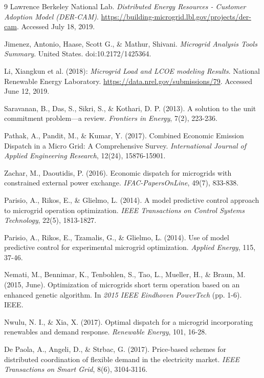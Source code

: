 \documentclass[final,3p,times]{elsarticle}
\begin{document}
\begin{thebibliography}{9}
Lawrence Berkeley National Lab. \textit{Distributed Energy Resources - Customer Adoption Model (DER-CAM)}. \url{https://building-microgrid.lbl.gov/projects/der-cam}. Accessed July 18, 2019. 

Jimenez, Antonio, Haase, Scott G., \& Mathur, Shivani. \textit{Microgrid Analysis Tools Summary}. United States. doi:10.2172/1425364.

Li, Xiangkun et al. (2018): \textit{Microgrid Load and LCOE modeling Results}. National Renewable Energy Laboratory. \url{https://data.nrel.gov/submissions/79}. Accessed June 12, 2019. 

Saravanan, B., Das, S., Sikri, S., \& Kothari, D. P. (2013). A solution to the unit commitment problem—a review. \textit{Frontiers in Energy}, 7(2), 223-236.

Pathak, A., Pandit, M., \& Kumar, Y. (2017). Combined Economic Emission Dispatch in a Micro Grid: A Comprehensive Survey. \textit{International Journal of Applied Engineering Research}, 12(24), 15876-15901.

Zachar, M., Daoutidis, P. (2016). Economic dispatch for microgrids with constrained external power exchange. \textit{IFAC-PapersOnLine}, 49(7), 833-838.

Parisio, A., Rikos, E., \& Glielmo, L. (2014). A model predictive control approach to microgrid operation optimization. \textit{IEEE Transactions on Control Systems Technology}, 22(5), 1813-1827.

Parisio, A., Rikos, E., Tzamalis, G., \& Glielmo, L. (2014). Use of model predictive control for experimental microgrid optimization. \textit{Applied Energy}, 115, 37-46.

Nemati, M., Bennimar, K., Tenbohlen, S., Tao, L., Mueller, H., \& Braun, M. (2015, June). Optimization of microgrids short term operation based on an enhanced genetic algorithm. In \textit{2015 IEEE Eindhoven PowerTech} (pp. 1-6). IEEE.

Nwulu, N. I., \& Xia, X. (2017). Optimal dispatch for a microgrid incorporating renewables and demand response. \textit{Renewable Energy}, 101, 16-28.

De Paola, A., Angeli, D., \& Strbac, G. (2017). Price-based schemes for distributed coordination of flexible demand in the electricity market. \textit{IEEE Transactions on Smart Grid}, 8(6), 3104-3116.


\end{thebibliography}
\end{document}
